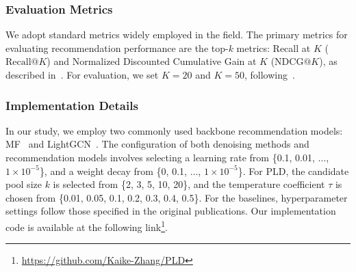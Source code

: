 \subsubsection{Evaluation Metrics}
We adopt standard metrics widely employed in the field. The primary metrics for evaluating recommendation performance are the top-$k$ metrics: Recall at $K$ ($\mathrm{Recall}@K$) and Normalized Discounted Cumulative Gain at $K$ ($\mathrm{NDCG}@K$), as described in~\cite{zhang2023robust, he2020lightgcn, herlocker2004evaluating}. For evaluation, we set $K=20$ and $K=50$, following~\cite{wang2019neural, zhang2024improving}.

\subsubsection{Implementation Details} 
In our study, we employ two commonly used backbone recommendation models: MF~\cite{koren2009matrix} and LightGCN~\cite{he2020lightgcn}. The configuration of both denoising methods and recommendation models involves selecting a learning rate from \{0.1, 0.01, $\dots$, $1 \times 10^{-5}$\}, and a weight decay from \{0, 0.1, $\dots$, $1 \times 10^{-5}$\}. For PLD, the candidate pool size $k$ is selected from \{2, 3, 5, 10, 20\}, and the temperature coefficient $\tau$ is chosen from \{0.01, 0.05, 0.1, 0.2, 0.3, 0.4, 0.5\}. For the baselines, hyperparameter settings follow those specified in the original publications. Our implementation code is available at the following link\footnote{\url{https://github.com/Kaike-Zhang/PLD}}.





